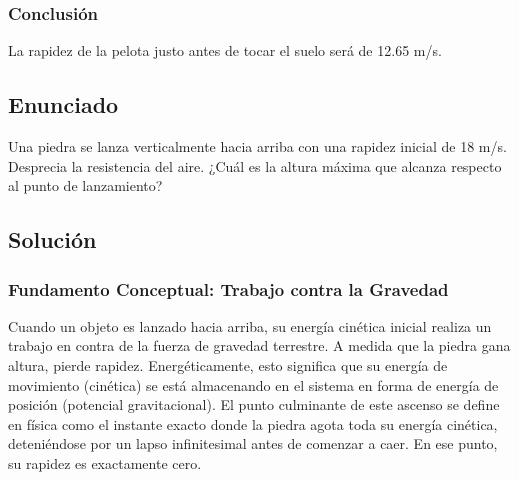 \documentclass[12pt,a4paper]{article}
\begin{document}
\subsubsection*{Conclusión}
La rapidez de la pelota justo antes de tocar el suelo será de 12.65 m/s.

\newpage
\subsection*{Enunciado}
Una piedra se lanza verticalmente hacia arriba con una rapidez inicial de 18 m/s. Desprecia la resistencia del aire. ¿Cuál es la altura máxima que alcanza respecto al punto de lanzamiento?

\begin{center}
\end{center}

\subsection*{Solución}

\subsubsection*{Fundamento Conceptual: Trabajo contra la Gravedad}
Cuando un objeto es lanzado hacia arriba, su energía cinética inicial realiza un trabajo en contra de la fuerza de gravedad terrestre. A medida que la piedra gana altura, pierde rapidez. Energéticamente, esto significa que su energía de movimiento (cinética) se está almacenando en el sistema en forma de energía de posición (potencial gravitacional). El punto culminante de este ascenso se define en física como el instante exacto donde la piedra agota toda su energía cinética, deteniéndose por un lapso infinitesimal antes de comenzar a caer. En ese punto, su rapidez es exactamente cero.
\end{document}
